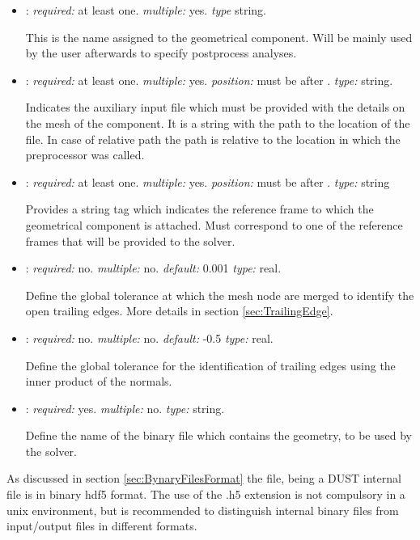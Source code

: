 \begin{itemize}
\item {}: \textit{required:} at least one. \textit{multiple:} yes. \textit{type} string.

This is the name assigned to the geometrical component. Will be mainly used by 
the user afterwards to specify postprocess analyses.

\item {}: \textit{required:} at least one. \textit{multiple:} yes. 
\textit{position:} must be after . \textit{type:} string. 

Indicates the auxiliary input file which must be provided with the details on the 
mesh of the component. It is a string with the path to the location of the file. 
In case of relative path the path is relative to the location in which the preprocessor was called.

\item {}: \textit{required:} at least one. \textit{multiple:} yes. 
\textit{position:} must be after . \textit{type:} string

Provides a string tag which indicates the reference frame to which the geometrical 
component is attached. Must correspond to one of the reference frames that will be 
provided to the solver. 

\item {}: \textit{required:} no. \textit{multiple:} no. 
\textit{default:} 0.001  \textit{type:} real.

Define the global tolerance at which the mesh node are merged to identify the open 
trailing edges. More details in section \ref{sec:TrailingEdge}.

\item {}: \textit{required:} no. \textit{multiple:} no. \textit{default:} -0.5 \textit{type:} real.

Define the global tolerance for the identification of trailing edges using the 
inner product of the normals.

\item {}: \textit{required:} yes. \textit{multiple:} no. \textit{type:} string.

Define the name of the binary file which contains the geometry, to be used by the solver.
\end{itemize}

As discussed in section \ref{sec:BynaryFilesFormat} the file, being a DUST internal 
file is in binary hdf5 format. The use of the .h5 extension is not compulsory in a unix 
environment, but is recommended to distinguish internal binary files from input/output files 
in different formats.

